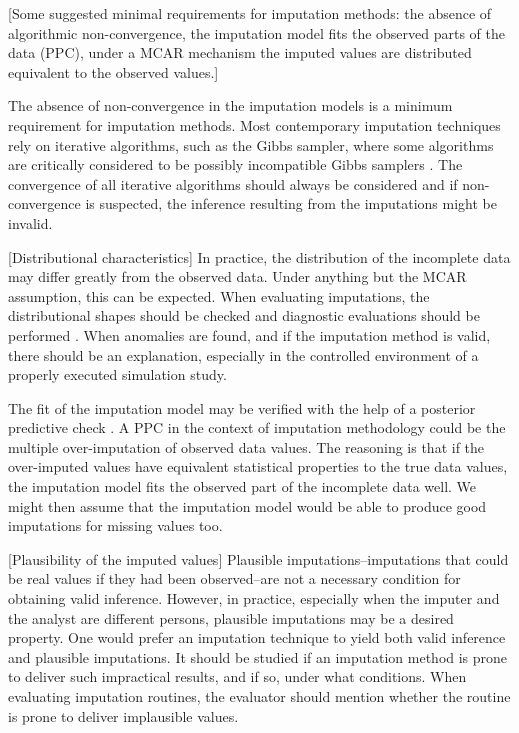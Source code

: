 \documentclass[bimj,fleqn]{w-art}
\begin{document}
[Some suggested minimal requirements for imputation methods: the absence of algorithmic non-convergence, the imputation model fits the observed parts of the data (PPC), under a MCAR mechanism the imputed values are distributed equivalent to the observed values.]


The absence of non-convergence in the imputation models is a minimum requirement for imputation methods. Most contemporary imputation techniques rely on iterative algorithms, such as the Gibbs sampler, where some algorithms are critically considered to be possibly incompatible Gibbs samplers \citep[PIGS,][]{li2012imputing}. The convergence of all iterative algorithms should always be considered and if non-convergence is suspected, the inference resulting from the imputations might be invalid. 

[Distributional characteristics] In practice, the distribution of the incomplete data may differ greatly from the observed data. Under anything but the MCAR assumption, this can be expected. When evaluating imputations, the distributional shapes should be checked and diagnostic evaluations should be performed \citep[see][for a detailed overview of diagnostic evaluation for multivariate imputations]{abayomi2008diagnostics}. When anomalies are found, and if the imputation method is valid, there should be an explanation, especially in the controlled environment of a properly executed simulation study. 

The fit of the imputation model may be verified with the help of a posterior predictive check \citep[PPC][]{nguy17, zhao22}. A PPC in the context of imputation methodology could be the multiple over-imputation of observed data values. The reasoning is that if the over-imputed values have equivalent statistical properties to the true data values, the imputation model fits the observed part of the incomplete data well. We might then assume that the imputation model would be able to produce good imputations for missing values too. 

[Plausibility of the imputed values] Plausible imputations--imputations that could be real values if they had been observed--are not a necessary condition for obtaining valid inference. However, in practice, especially when the imputer and the analyst are different persons, plausible imputations may be a desired property. One would prefer an imputation technique to yield both valid inference and plausible imputations. It should be studied if an imputation method is prone to deliver such impractical results, and if so, under what conditions. When evaluating imputation routines, the evaluator should mention whether the routine is prone to deliver implausible values. 
\end{document}
